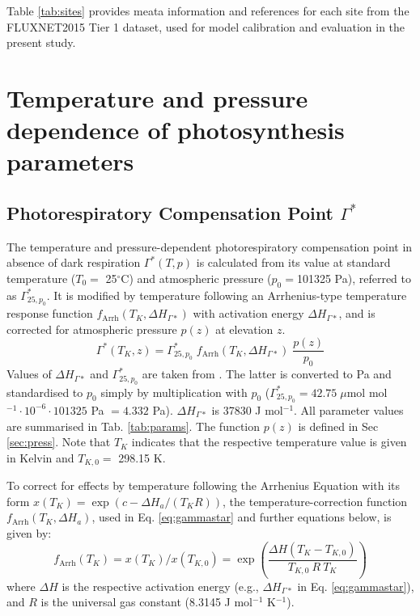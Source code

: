 \documentclass[gmd, manuscript]{copernicus}
\begin{document}
Table \ref{tab:sites} provides meata information and references for each site from the FLUXNET2015 Tier 1 dataset, used for model calibration and evaluation in the present study.


\section{Temperature and pressure dependence of photosynthesis parameters}

\subsection{Photorespiratory Compensation Point $\Gamma^\ast$}
\label{sec:gammastar}
The temperature and pressure-dependent photorespiratory compensation point in absence of dark respiration $\Gamma^\ast(T,p)$ is calculated from its value at standard temperature ($T_0=$ 25${^\circ}$C) and atmospheric pressure ($p_0 = $101325 Pa), referred to as $\Gamma^\ast_{25, p_0}$. It is modified by temperature following an Arrhenius-type temperature response function $f_{\text{Arrh}}(T_K, \Delta H_{\Gamma\ast})$ with activation energy $\Delta H_{\Gamma\ast}$, and is corrected for atmospheric pressure $p(z)$ at elevation $z$. 
\begin{equation}
\label{eq:gammastar}
    \Gamma^\ast (T_K, z) = \Gamma^\ast_{25, p_0} \; f_{\text{Arrh}}(T_K, \Delta H_{\Gamma\ast}) \; \frac{p(z)}{p_0}
\end{equation}
Values of $\Delta H_{\Gamma\ast}$ and $\Gamma^\ast_{25, p_0}$ are taken from \citet{bernacchi01}. The latter is converted to Pa and standardised to $p_0$ simply by multiplication with $p_0$ ($\Gamma^\ast_{25, p_0} = 42.75\; \mu$mol mol$^{-1} \cdot 10^{-6} \cdot 101325$ Pa $ = 4.332$ Pa). $\Delta H_{\Gamma\ast}$ is 37830 J mol$^{-1}$. All parameter values are summarised in Tab. \ref{tab:params}. The function $p(z)$ is defined in Sec \ref{sec:press}. Note that $T_K$ indicates that the respective temperature value is given in Kelvin and $T_{K,0}=$ 298.15 K.

To correct for effects by temperature following the Arrhenius Equation with its form $x(T_K)=\exp(c-\Delta H_a/(T_K R))$, the temperature-correction function $f_{\text{Arrh}}(T_K, \Delta H_a)$, used in Eq. \ref{eq:gammastar} and further equations below, is given by:
\begin{equation}
    f_{\text{Arrh}}(T_K) = x(T_K)/x(T_{K,0}) = \exp \left( \frac{\Delta H (T_K - T_{K,0})}{T_{K,0}\: R\: T_K} \right) 
\end{equation}
where $\Delta H$ is the respective activation energy (e.g., $\Delta H_{\Gamma\ast}$ in Eq. \ref{eq:gammastar}), and $R$ is the universal gas constant (8.3145 J mol$^{-1}$ K$^{-1}$).
\end{document}
